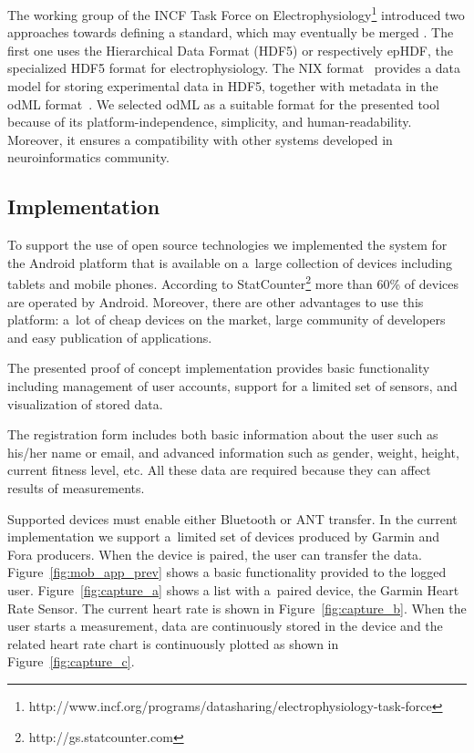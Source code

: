 \documentclass[a4paper,twoside]{article}
\begin{document}
The working group of the INCF Task Force on Electrophysiology\footnote{http://www.incf.org/programs/datasharing/electrophysiology-task-force} introduced two approaches towards defining a standard, which may eventually be merged \cite{10.3389/conf.fninf.2013.09.00069}. The first one uses the Hierarchical Data Format (HDF5) \cite{hdf5} or respectively epHDF, the  specialized HDF5 format for electrophysiology. The NIX format~\cite{Stoewer:2014} provides a data model for storing experimental data in HDF5, together with metadata in the odML format~\cite{10.3389/fninf.2011.00016}. We selected odML as a suitable format for the presented tool because of its platform-independence, simplicity, and human-readability. Moreover, it ensures a compatibility with other systems developed in neuroinformatics community.

\subsection{Implementation}

To support the use of open source technologies we implemented the system for the Android platform that is available on a~large collection of devices including tablets and mobile phones. According to StatCounter\footnote{http://gs.statcounter.com} more than 60\% of devices are operated by Android. Moreover, there are other advantages to use this platform: a~lot of cheap devices on the market, large community of developers and easy publication of applications.

The presented proof of concept implementation provides basic functionality including management of user accounts, support for a limited set of sensors, and visualization of stored data.

The registration form includes both basic information about the user such as his/her name or email, and advanced information such as gender, weight, height, current fitness level, etc. All these data are required because they can affect results of measurements.

Supported devices must enable either Bluetooth or ANT transfer. In the current implementation we support a~limited set of devices produced by Garmin and Fora producers. When the device is paired, the user can transfer the data. Figure~\ref{fig:mob_app_prev} shows a basic functionality provided to the logged user. Figure~\ref{fig:capture_a} shows a list with a~paired device, the Garmin Heart Rate Sensor. The current heart rate is shown in Figure~\ref{fig:capture_b}. When the user starts a measurement, data are continuously stored in the device and the related heart rate chart is continuously plotted as shown in Figure~\ref{fig:capture_c}.
\end{document}
